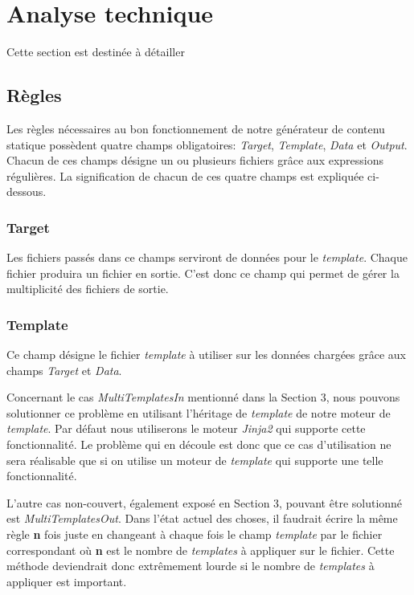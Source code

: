 \section{Analyse technique}
	Cette section est destinée à détailler
	
	\subsection{Règles}
		Les règles nécessaires au bon fonctionnement de notre générateur de contenu statique possèdent quatre champs obligatoires: \textit{Target}, \textit{Template}, \textit{Data} et \textit{Output}. Chacun de ces champs désigne un ou plusieurs fichiers grâce aux expressions régulières. La signification de chacun de ces quatre champs est expliquée ci-dessous. 
		
		\subsubsection*{Target}
			Les fichiers passés dans ce champs serviront de données pour le \textit{template}. Chaque fichier produira un fichier en sortie. C'est donc ce champ qui permet de gérer la multiplicité des fichiers de sortie.
		
		\subsubsection*{Template}
			Ce champ désigne le fichier \textit{template} à utiliser sur les données chargées grâce aux champs \textit{Target} et \textit{Data}. 
			
			Concernant le cas \textit{MultiTemplatesIn} mentionné dans la Section 3, nous pouvons solutionner ce problème en utilisant l'héritage de \textit{template} de notre moteur de \textit{template}. Par défaut nous utiliserons le moteur \textit{Jinja2} \cite{Jinja2} qui supporte cette fonctionnalité. Le problème qui en découle est donc que ce cas d'utilisation ne sera réalisable que si on utilise un moteur de \textit{template} qui supporte une telle fonctionnalité.
			
			L'autre cas non-couvert, également exposé en Section 3, pouvant être solutionné est \textit{MultiTemplatesOut}. Dans l'état actuel des choses, il faudrait écrire la même règle \textbf{n} fois juste en changeant à chaque fois le champ \textit{template} par le fichier correspondant où \textbf{n} est le nombre de \textit{templates} à appliquer sur le fichier. Cette méthode deviendrait donc extrêmement lourde si le nombre de \textit{templates} à appliquer est important.
		
